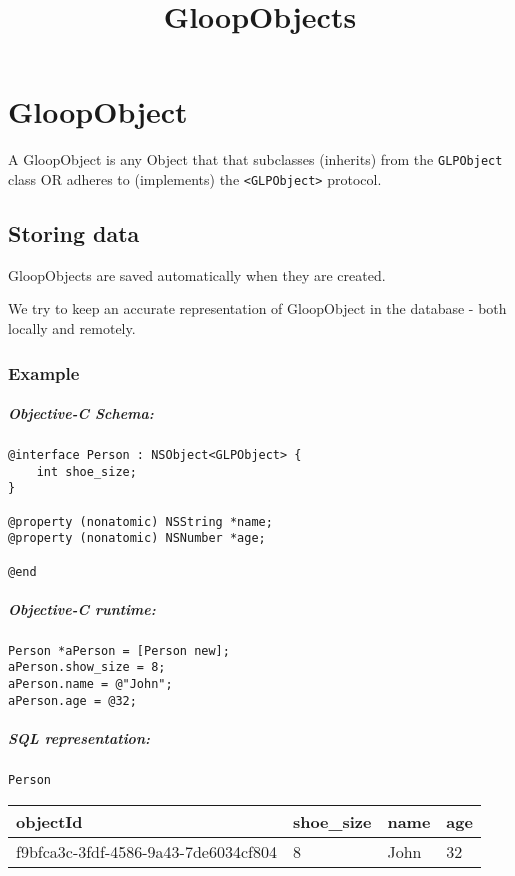 \documentclass[]{article}
\title{GloopObjects}
\date{}
\let\oldsubparagraph\subparagraph
\renewcommand{\subparagraph}[1]{\oldsubparagraph{#1}\mbox{}}
\begin{document}
\maketitle

\section{GloopObject}\label{gloopobject}

A GloopObject is any Object that that subclasses (inherits) from the
\texttt{GLPObject} class OR adheres to (implements) the
\texttt{\textless{}GLPObject\textgreater{}} protocol.

\subsection{Storing data}\label{storing-data}

GloopObjects are saved automatically when they are created.

We try to keep an accurate representation of GloopObject in the database
- both locally and remotely.

\subsubsection{Example}\label{example}

\subparagraph{Objective-C Schema:}\label{objective-c-schema}

\begin{verbatim}
@interface Person : NSObject<GLPObject> {
    int shoe_size;
}

@property (nonatomic) NSString *name;
@property (nonatomic) NSNumber *age;

@end
\end{verbatim}

\subparagraph{Objective-C runtime:}\label{objective-c-runtime}

\begin{verbatim}
Person *aPerson = [Person new];
aPerson.show_size = 8;
aPerson.name = @"John";
aPerson.age = @32;
\end{verbatim}

\subparagraph{SQL representation:}\label{sql-representation}

\texttt{Person}

\begin{longtable}[]{@{}llll@{}}
\toprule
objectId & shoe\_size & name & age\tabularnewline
\midrule
\endhead
f9bfca3c-3fdf-4586-9a43-7de6034cf804 & 8 & John & 32\tabularnewline
\bottomrule
\end{longtable}
\end{document}
